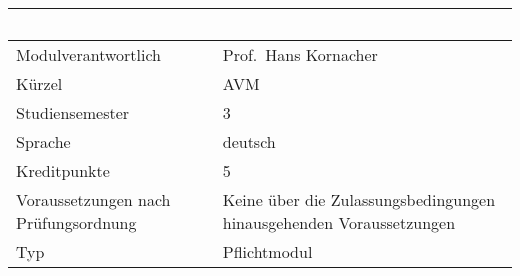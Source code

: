 \begin{longtable}[]{@{}ll@{}}
\toprule
\begin{minipage}[b]{0.12\columnwidth}\raggedright\strut
~\strut
\end{minipage} & \begin{minipage}[b]{0.12\columnwidth}\raggedright\strut
~\strut
\end{minipage}\tabularnewline
\midrule
\endhead
\begin{minipage}[t]{0.12\columnwidth}\raggedright\strut
Modulverantwortlich\strut
\end{minipage} & \begin{minipage}[t]{0.12\columnwidth}\raggedright\strut
Prof.~Hans Kornacher\strut
\end{minipage}\tabularnewline
\begin{minipage}[t]{0.12\columnwidth}\raggedright\strut
Kürzel\strut
\end{minipage} & \begin{minipage}[t]{0.12\columnwidth}\raggedright\strut
AVM\strut
\end{minipage}\tabularnewline
\begin{minipage}[t]{0.12\columnwidth}\raggedright\strut
Studiensemester\strut
\end{minipage} & \begin{minipage}[t]{0.12\columnwidth}\raggedright\strut
3\strut
\end{minipage}\tabularnewline
\begin{minipage}[t]{0.12\columnwidth}\raggedright\strut
Sprache\strut
\end{minipage} & \begin{minipage}[t]{0.12\columnwidth}\raggedright\strut
deutsch\strut
\end{minipage}\tabularnewline
\begin{minipage}[t]{0.12\columnwidth}\raggedright\strut
Kreditpunkte\strut
\end{minipage} & \begin{minipage}[t]{0.12\columnwidth}\raggedright\strut
5\strut
\end{minipage}\tabularnewline
\begin{minipage}[t]{0.12\columnwidth}\raggedright\strut
Voraussetzungen nach Prüfungsordnung\strut
\end{minipage} & \begin{minipage}[t]{0.12\columnwidth}\raggedright\strut
Keine über die Zulassungsbedingungen hinausgehenden
Voraussetzungen\strut
\end{minipage}\tabularnewline
\begin{minipage}[t]{0.12\columnwidth}\raggedright\strut
Typ\strut
\end{minipage} & \begin{minipage}[t]{0.12\columnwidth}\raggedright\strut
Pflichtmodul\strut
\end{minipage}\tabularnewline
\bottomrule
\end{longtable}

